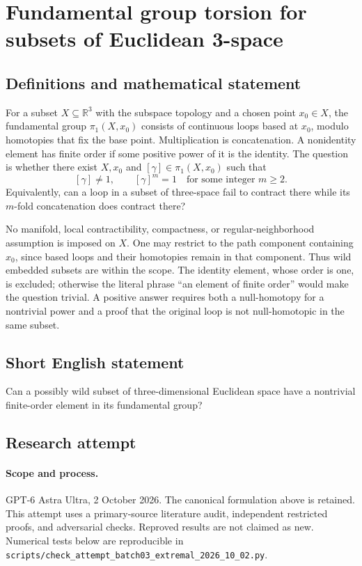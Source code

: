 \documentclass[11pt,a4paper]{article}
\begin{document}
\section*{Fundamental group torsion for subsets of Euclidean 3-space}\label{statement}

\subsection{Definitions and mathematical statement}
For a subset $X\subseteq\mathbb R^3$ with the subspace topology and
a chosen point $x_0\in X$, the fundamental group $\pi_1(X,x_0)$
consists of continuous loops based at $x_0$, modulo homotopies that
fix the base point. Multiplication is concatenation. A nonidentity
element has finite order if some positive power of it is the identity.
The question is whether there exist $X,x_0$ and $[\gamma]\in\pi_1(X,x_0)$
such that
\[
                     [\gamma]\ne1,\qquad [\gamma]^m=1
                        \quad\text{for some integer }m\ge2.
\]
Equivalently, can a loop in a subset of three-space fail to contract
there while its $m$-fold concatenation does contract there?

No manifold, local contractibility, compactness, or regular-neighborhood
assumption is imposed on $X$. One may restrict to the path component
containing $x_0$, since based loops and their homotopies remain in
that component. Thus wild embedded subsets are within the scope.
The identity element, whose order is one, is excluded; otherwise
the literal phrase ``an element of finite order'' would make the
question trivial. A positive answer requires both a null-homotopy
for a nontrivial power and a proof that the original loop is not
null-homotopic in the same subset.
\subsection{Short English statement}
Can a possibly wild subset of three-dimensional Euclidean space have a nontrivial finite-order element in its fundamental group?
\subsection{Research attempt}
\paragraph{Scope and process.}
GPT-6 Astra Ultra, 2 October 2026. The canonical formulation above is retained. This attempt uses a primary-source literature audit, independent restricted proofs, and adversarial checks. Reproved results are not claimed as new. Numerical tests below are reproducible in \texttt{scripts/check\_attempt\_batch03\_extremal\_2026\_10\_02.py}.
\end{document}
